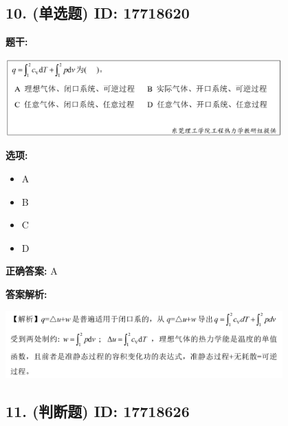 \documentclass[12pt]{article}
\begin{document}
\vspace{0.5em}\hrulefill\vspace{1em}

\subsection*{10. (单选题) \small ID: 17718620}

\textbf{题干:}


\begin{center}\includegraphics[width=0.8\textwidth, height=0.25\textheight, keepaspectratio]{question_10_17718620/title_img_1.png}\end{center}

\textbf{选项:}
\begin{itemize}[leftmargin=*]
  \item A

  \item B

  \item C

  \item D

\end{itemize}

\textbf{正确答案:}
A

\textbf{答案解析:}


\begin{center}\includegraphics[width=0.8\textwidth, height=0.25\textheight, keepaspectratio]{question_10_17718620/correct_replay_img_1.png}\end{center}

\vspace{0.5em}\hrulefill\vspace{1em}

\subsection*{11. (判断题) \small ID: 17718626}
\end{document}
